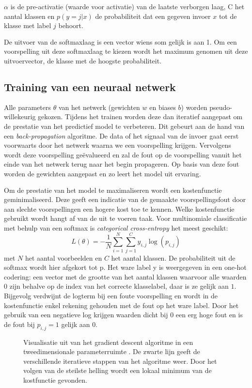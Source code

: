 \npar $\alpha$ is de pre-activatie (waarde voor activatie) van de laatste verborgen laag, C het aantal klassen en $p(y=j|x)$ de probabiliteit dat een gegeven invoer $x$ tot de klasse met label $j$ behoort.

\npar De uitvoer van de softmaxlaag is een vector wiens som gelijk is aan 1. Om een voorspelling uit deze softmaxlaag te kiezen wordt het maximum genomen uit deze uitvoervector, de klasse met de hoogste probabiliteit. 

\subsection{Training van een neuraal netwerk}\label{sec:leren}
Alle parameters $\theta$ van het netwerk (gewichten $w$ en biases $b$) worden pseudo-willekeurig gekozen. Tijdens het trainen worden deze dan iteratief aangepast om de prestatie van het predictief model te verbeteren. Dit gebeurt aan de hand van een \textit{back-propagation} algoritme. De data of het signaal van de invoer gaat eerst voorwaarts door het netwerk waarna we een voorspelling krijgen. Vervolgens wordt deze voorspelling ge\"evalueerd en zal de fout op de voorspelling vanuit het einde van het netwerk terug naar het begin propageren. Op basis van deze fout worden de gewichten aangepast en zo leert het model uit ervaring.

\npar Om de prestatie van het model te maximaliseren wordt een kostenfunctie geminimaliseerd. Deze geeft een indicatie van de gemaakte voorspellingsfout door aan slechte voorspellingen een hogere kost toe te kennen. Welke kostenfunctie gebruikt wordt hangt af van de uit te voeren taak. Voor multinomiale classificatie met behulp van een softmax is \textit{categorical cross-entropy} het meest geschikt:
\begin{equation}
L(\theta) = - \frac{1}{N}\sum_{i=1}^{N}\sum_{j=1}^{C}y_{i,j}\log(p_{i,j})
\end{equation}
met $N$ het aantal voorbeelden en $C$ het aantal klassen. De probabiliteit uit de softmax wordt hier afgekort tot p. Het ware label y is weergegeven in een one-hot codering: een vector met de grootte van het aantal klassen waarvoor alle waarden $0$ zijn behalve op de index van het correcte klasselabel, daar is ze gelijk aan $1$. Bijgevolg verdwijnt de logterm bij een foute voorspelling en wordt in de kostenfunctie enkel rekening gehouden met de fout op het ware label. Door het gebruik van een negatieve log krijgen waarden dicht bij $0$ een erg hoge fout en is de fout bij $p_{i,j}=1$ gelijk aan $0$. 
\begin{figure}[!t]
	\centering
	\def\svgwidth{0.6\columnwidth}
	
	\caption{Visualisatie uit \cite{andrew_ng} van het gradient descent algoritme in een tweedimensionale parameterruimte . De zwarte lijn geeft de verschillende iteratieve stappen van het algoritme weer. Door het volgen van de steilste helling wordt een lokaal minimum van de kostfunctie gevonden.}
	\label{fig:gradient-descent}
\end{figure}

